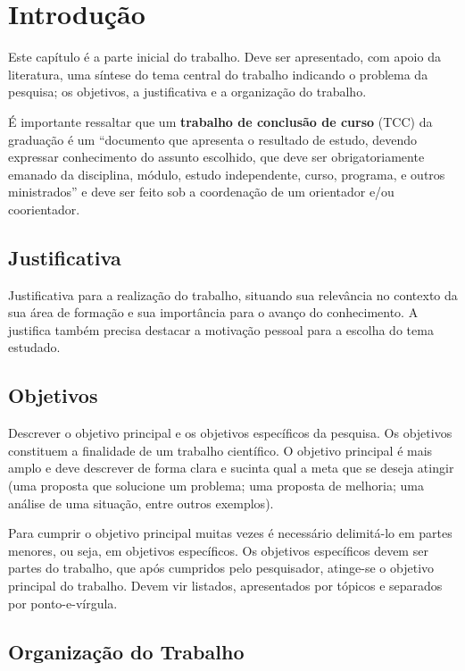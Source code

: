 \chapter{Introdução} \label{Introducao}


Este capítulo é a parte inicial do trabalho. Deve ser apresentado, com apoio da literatura, uma síntese do tema central do trabalho indicando o problema da pesquisa; os objetivos, a justificativa e a organização do trabalho. 


É importante ressaltar que um \textbf{trabalho de conclusão de curso} (TCC) da graduação é um ``documento que apresenta o resultado de estudo, devendo expressar conhecimento do assunto escolhido, que deve ser obrigatoriamente emanado da disciplina, módulo, estudo independente, curso, programa, e outros ministrados'' \cite{NBR14724:2011}  e  deve ser feito sob a coordenação de um orientador e/ou coorientador.

\section{Justificativa}

Justificativa para a realização do trabalho, situando sua relevância no contexto da sua área de formação e sua importância para o avanço do conhecimento. A justifica também precisa destacar a motivação pessoal para a escolha do tema estudado.

\section{Objetivos}

Descrever o objetivo principal e os objetivos específicos da pesquisa. Os objetivos constituem a finalidade de um trabalho científico. O objetivo principal é mais amplo e deve descrever de forma clara e sucinta qual a meta que se deseja atingir (uma proposta que solucione um problema; uma proposta de melhoria; uma análise de uma situação, entre outros exemplos). 

Para cumprir o objetivo principal muitas vezes é necessário delimitá-lo em partes menores, ou seja, em objetivos específicos. Os objetivos específicos devem ser partes do trabalho, que após cumpridos pelo pesquisador, atinge-se  o objetivo principal do trabalho. Devem vir listados, apresentados por tópicos e separados por ponto-e-vírgula.




\section{Organização do Trabalho}

